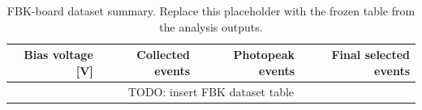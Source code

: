 \begin{table}[t]
    \centering
    \caption{FBK-board dataset summary. Replace this placeholder with the frozen table from the analysis outputs.}
    \label{tab:fbk-dataset}
    \begin{tabular}{rrrr}
        \toprule
        Bias voltage [V] & Collected events & Photopeak events & Final selected events \\
        \midrule
        \multicolumn{4}{c}{TODO: insert FBK dataset table} \\
        \bottomrule
    \end{tabular}
\end{table}
